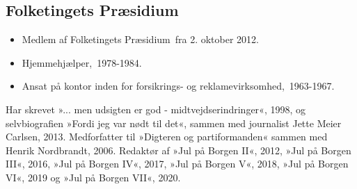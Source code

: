 \documentclass[11pt, a4paper]{awesome-cv}
\begin{document}
\begin{cvletter}
\subsection*{Folketingets Præsidium}
\begin{itemize}
\item Medlem af Folketingets Præsidium fra 2. oktober 2012.
\end{itemize}
\begin{itemize}
\item Hjemmehjælper, 1978-1984.
\item Ansat på kontor inden for forsikrings- og reklamevirksomhed, 1963-1967.
\end{itemize}
Har skrevet »... men udsigten er god - midtvejdserindringer«, 1998, og selvbiografien »Fordi jeg var nødt til det«, sammen med journalist Jette Meier Carlsen, 2013. Medforfatter til »Digteren og partiformanden« sammen med Henrik Nordbrandt, 2006. Redaktør af »Jul på Borgen II«, 2012, »Jul på Borgen III«, 2016, »Jul på Borgen IV«, 2017, »Jul på Borgen V«, 2018, »Jul på Borgen VI«, 2019 og »Jul på Borgen VII«, 2020.

\end{cvletter}
\end{document}

